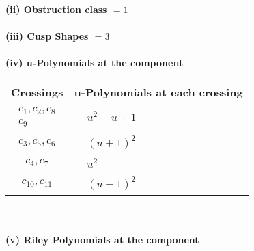 \documentclass[1p]{elsarticle_modified}
\theoremstyle{definition}
\begin{document}
\flushleft \textbf{(ii) Obstruction class $= 1$}\\~\\
\flushleft \textbf{(iii) Cusp Shapes $= 3$}\\~\\
\newpage\renewcommand{\arraystretch}{1}
\flushleft \textbf{(iv) u-Polynomials at the component}\newline \\
\begin{tabular}{m{50pt}|m{274pt}}
Crossings & \hspace{64pt}u-Polynomials at each crossing \\
\hline $$\begin{aligned}c_{1},c_{2},c_{8}\\c_{9}\end{aligned}$$&$\begin{aligned}
&u^2- u+1
\end{aligned}$\\
\hline $$\begin{aligned}c_{3},c_{5},c_{6}\end{aligned}$$&$\begin{aligned}
&(u+1)^2
\end{aligned}$\\
\hline $$\begin{aligned}c_{4},c_{7}\end{aligned}$$&$\begin{aligned}
&u^2
\end{aligned}$\\
\hline $$\begin{aligned}c_{10},c_{11}\end{aligned}$$&$\begin{aligned}
&(u-1)^2
\end{aligned}$\\
\hline
\end{tabular}\\~\\
\newpage\renewcommand{\arraystretch}{1}
\flushleft \textbf{(v) Riley Polynomials at the component}\newline \\
\end{document}

